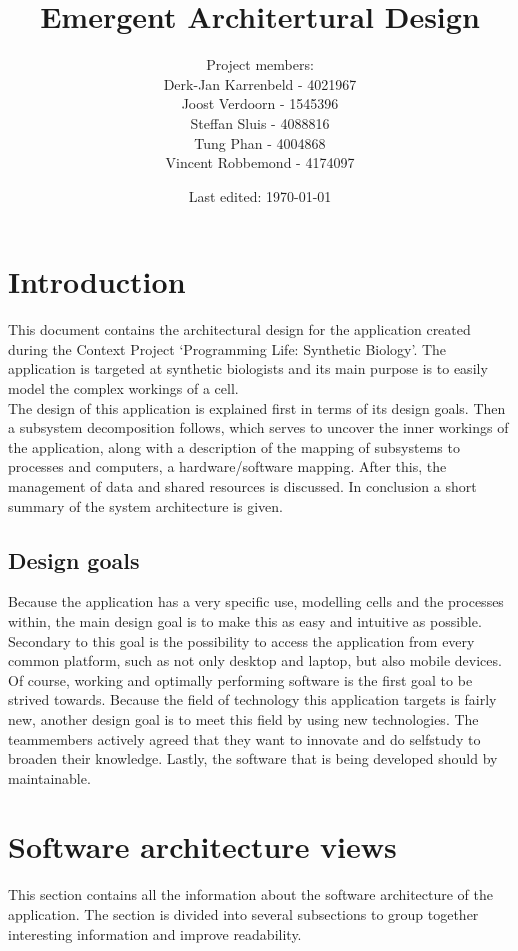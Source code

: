 \documentclass{report}
\title{Emergent Architertural Design}
\date{Last edited: \today}
\author{Project members: \\
	Derk-Jan Karrenbeld - 4021967\\
	Joost Verdoorn - 1545396\\
	Steffan Sluis - 4088816\\
	Tung Phan - 4004868\\
	Vincent Robbemond - 4174097
	}
\begin{document}
	\maketitle

	\setcounter{section}{0}
	\setcounter{secnumdepth}{3}
	\setcounter{tocdepth}{5}
	\renewcommand*\thesection{\arabic{section}}
	
	\tableofcontents

	\clearpage

	\section{Introduction}
		This document contains the architectural design for the application created during the Context Project `Programming Life: Synthetic Biology'. The application is targeted at synthetic biologists and its main purpose is to easily model the complex workings of a cell. \\
		The design of this application is explained first in terms of its design goals. Then a subsystem decomposition follows, which serves to uncover the inner workings of the application, along with a description of the mapping of subsystems to processes and computers, a hardware/software mapping. After this, the management of data and shared resources is discussed. In conclusion a short summary of the system architecture is given.
		\subsection{Design goals}
			Because the application has a very specific use, modelling cells and the processes within, the main design goal is to make this as easy and intuitive as possible. Secondary to this goal is the possibility to access the application from every common platform, such as not only desktop and laptop, but also mobile devices. Of course, working and optimally performing software is the first goal to be strived towards.
			Because the field of technology this application targets is fairly new, another design goal is to meet this field by using new technologies. The teammembers actively agreed that they want to innovate and do selfstudy to broaden their knowledge. 
			Lastly, the software that is being developed should by maintainable. 
	\clearpage
	\section{Software architecture views}
		This section contains all the information about the software architecture of the application. The section is divided into several subsections to group together interesting information and improve readability.
\end{document}
